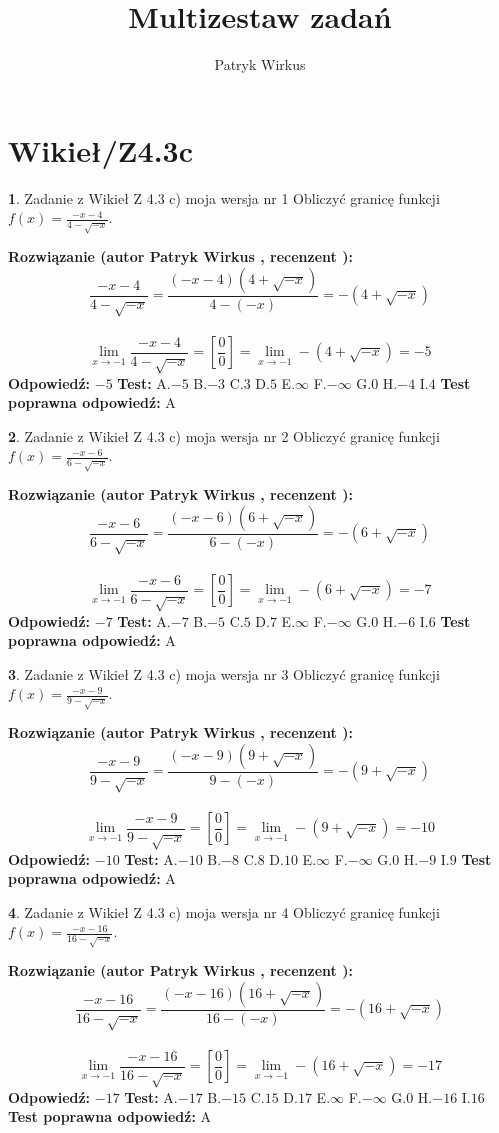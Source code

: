 \documentclass[12pt, a4paper]{article}
\title{Multizestaw zadań}
\author{Patryk Wirkus}
\date{}
\theoremstyle{definition} %
\newtheorem{zad}{}
\newcommand{\kategoria}[1]{\section{#1}}
\newcommand{\zadStart}[1]{\begin{zad}#1\newline}
\newcommand{\zadStop}{\end{zad}}
\newcommand{\rozwStart}[2]{\noindent \textbf{Rozwiązanie (autor #1 , recenzent #2): }\newline}
\newcommand{\rozwStop}{\newline}
\newcommand{\odpStart}{\noindent \textbf{Odpowiedź:}\newline}
\newcommand{\odpStop}{\newline}
\newcommand{\testStart}{\noindent \textbf{Test:}\newline}
\newcommand{\testStop}{\newline}
\newcommand{\kluczStart}{\noindent \textbf{Test poprawna odpowiedź:}\newline}
\newcommand{\kluczStop}{\newline}
\begin{document}
\maketitle

\kategoria{Wikieł/Z4.3c}


\zadStart{Zadanie z Wikieł Z 4.3 c) moja wersja nr 1}
Obliczyć granicę funkcji $f(x)=\frac{-x-4}{4-\sqrt{-x}}$.
\zadStop
\rozwStart{Patryk Wirkus}{}
$$\frac{-x-4}{4-\sqrt{-x}}=\frac{(-x-4)(4+\sqrt{-x})}{4-(-x)}=-(4+\sqrt{-x})$$
\\
$$\lim\limits_{x\to-1}\frac{-x-4}{4-\sqrt{-x}}=[\frac{0}{0}]=\lim\limits_{x\to-1}-(4+\sqrt{-x}) =-5$$
\rozwStop
\odpStart
$-5$
\odpStop
\testStart
A.$-5$
B.$-3$
C.$3$
D.$5$
E.$\infty$
F.$-\infty$
G.$0$
H.$-4$
I.$4$
\testStop
\kluczStart
A
\kluczStop



\zadStart{Zadanie z Wikieł Z 4.3 c) moja wersja nr 2}
Obliczyć granicę funkcji $f(x)=\frac{-x-6}{6-\sqrt{-x}}$.
\zadStop
\rozwStart{Patryk Wirkus}{}
$$\frac{-x-6}{6-\sqrt{-x}}=\frac{(-x-6)(6+\sqrt{-x})}{6-(-x)}=-(6+\sqrt{-x})$$
\\
$$\lim\limits_{x\to-1}\frac{-x-6}{6-\sqrt{-x}}=[\frac{0}{0}]=\lim\limits_{x\to-1}-(6+\sqrt{-x}) =-7$$
\rozwStop
\odpStart
$-7$
\odpStop
\testStart
A.$-7$
B.$-5$
C.$5$
D.$7$
E.$\infty$
F.$-\infty$
G.$0$
H.$-6$
I.$6$
\testStop
\kluczStart
A
\kluczStop



\zadStart{Zadanie z Wikieł Z 4.3 c) moja wersja nr 3}
Obliczyć granicę funkcji $f(x)=\frac{-x-9}{9-\sqrt{-x}}$.
\zadStop
\rozwStart{Patryk Wirkus}{}
$$\frac{-x-9}{9-\sqrt{-x}}=\frac{(-x-9)(9+\sqrt{-x})}{9-(-x)}=-(9+\sqrt{-x})$$
\\
$$\lim\limits_{x\to-1}\frac{-x-9}{9-\sqrt{-x}}=[\frac{0}{0}]=\lim\limits_{x\to-1}-(9+\sqrt{-x}) =-10$$
\rozwStop
\odpStart
$-10$
\odpStop
\testStart
A.$-10$
B.$-8$
C.$8$
D.$10$
E.$\infty$
F.$-\infty$
G.$0$
H.$-9$
I.$9$
\testStop
\kluczStart
A
\kluczStop



\zadStart{Zadanie z Wikieł Z 4.3 c) moja wersja nr 4}
Obliczyć granicę funkcji $f(x)=\frac{-x-16}{16-\sqrt{-x}}$.
\zadStop
\rozwStart{Patryk Wirkus}{}
$$\frac{-x-16}{16-\sqrt{-x}}=\frac{(-x-16)(16+\sqrt{-x})}{16-(-x)}=-(16+\sqrt{-x})$$
\\
$$\lim\limits_{x\to-1}\frac{-x-16}{16-\sqrt{-x}}=[\frac{0}{0}]=\lim\limits_{x\to-1}-(16+\sqrt{-x}) =-17$$
\rozwStop
\odpStart
$-17$
\odpStop
\testStart
A.$-17$
B.$-15$
C.$15$
D.$17$
E.$\infty$
F.$-\infty$
G.$0$
H.$-16$
I.$16$
\testStop
\kluczStart
A
\kluczStop
\end{document}
